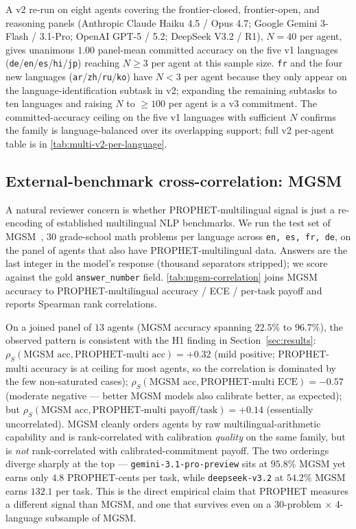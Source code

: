 A v2 re-run on eight agents covering the frontier-closed,
frontier-open, and reasoning panels (Anthropic Claude Haiku 4.5 /
Opus 4.7; Google Gemini 3-Flash / 3.1-Pro; OpenAI GPT-5 / 5.2;
DeepSeek V3.2 / R1), $N = 40$ per agent, gives unanimous $1.00$
panel-mean committed accuracy on the five v1 languages
(\texttt{de}/\texttt{en}/\texttt{es}/\texttt{hi}/\texttt{jp}) reaching
$N \ge 3$ per agent at this sample size. \texttt{fr} and the four new
languages (\texttt{ar}/\texttt{zh}/\texttt{ru}/\texttt{ko}) have
$N < 3$ per agent because they only appear on the
language-identification subtask in v2; expanding the remaining
subtasks to ten languages and raising $N$ to $\ge 100$ per agent is a
v3 commitment. The committed-accuracy ceiling on the five v1
languages with sufficient $N$ confirms the family is language-balanced
over its overlapping support; full v2 per-agent table is in
\autoref{tab:multi-v2-per-language}.



\subsection{External-benchmark cross-correlation: MGSM}\label{app:mgsm}
A natural reviewer concern is whether PROPHET-multilingual signal is
just a re-encoding of established multilingual NLP benchmarks. We run
the test set of MGSM~\cite{mgsm}, $30$ grade-school math problems per
language across \texttt{en, es, fr, de}, on the panel of agents that
also have PROPHET-multilingual data. Answers are the last integer in
the model's response (thousand separators stripped); we score against
the gold \texttt{answer\_number} field. \autoref{tab:mgsm-correlation}
joins MGSM accuracy to PROPHET-multilingual accuracy / ECE / per-task
payoff and reports Spearman rank correlations.



On a joined panel of $13$ agents (MGSM accuracy spanning
$22.5\%$ to $96.7\%$), the observed pattern is consistent with the H1
finding in Section~\ref{sec:results}:
$\rho_S(\textrm{MGSM acc}, \textrm{PROPHET-multi acc}) = +0.32$
(mild positive; PROPHET-multi accuracy is at ceiling for most agents,
so the correlation is dominated by the few non-saturated cases);
$\rho_S(\textrm{MGSM acc}, \textrm{PROPHET-multi ECE}) = -0.57$
(moderate negative --- better MGSM models also calibrate better, as
expected); but
$\rho_S(\textrm{MGSM acc}, \textrm{PROPHET-multi payoff/task}) = +0.14$
(essentially uncorrelated). MGSM cleanly orders agents by raw
multilingual-arithmetic capability and is rank-correlated with
calibration \emph{quality} on the same family, but is \emph{not}
rank-correlated with calibrated-commitment payoff. The two orderings
diverge sharply at the top --- \texttt{gemini-3.1-pro-preview} sits at
$95.8\%$ MGSM yet earns only $4.8$ PROPHET-cents per task, while
\texttt{deepseek-v3.2} at $54.2\%$ MGSM earns $132.1$ per task. This
is the direct empirical claim that PROPHET measures a different
signal than MGSM, and one that survives even on a $30$-problem
$\times$ 4-language subsample of MGSM.

